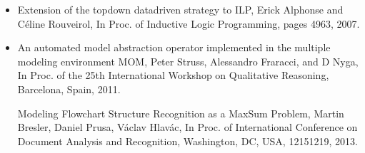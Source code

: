 \documentclass[letterpaper,10pt,openany,oneside,english]{sphinxmanual}
\begin{document}
\begin{itemize}
\sphinxAtStartPar
Exploiting structural relationships in audio music signals using markov logic networks,
Hélène Papadopoulos and George Tzanetakis,
In Proc. of 38th International Conference on Acoustics, Speech, and Signal Processing (ICASSP), pages 4493\sphinxhyphen{}4497, Canada, 2013.

\sphinxAtStartPar
Modeling chord and key structure with markov logic,
Hélène Papadopoulos and George Tzanetakis,
In Proc. of the Society for Music Information Retrieval (ISMIR), pages 121\sphinxhyphen{}126, 2012.

\item {} 
\sphinxAtStartPar
{}

\sphinxAtStartPar
Extension of the top\sphinxhyphen{}down data\sphinxhyphen{}driven strategy to ILP,
Erick Alphonse and Céline Rouveirol,
In Proc. of Inductive Logic Programming, pages 49\sphinxhyphen{}63, 2007.

\item {} 
\sphinxAtStartPar
{}

\sphinxAtStartPar
An automated model abstraction operator implemented in the multiple modeling environment MOM,
Peter Struss, Alessandro Fraracci, and D Nyga,
In Proc. of the 25th International Workshop on Qualitative Reasoning, Barcelona, Spain, 2011.

\sphinxAtStartPar
Modeling Flowchart Structure Recognition as a Max\sphinxhyphen{}Sum Problem,
Martin Bresler, Daniel Prusa, Václav Hlavác,
In Proc. of International Conference on Document Analysis and Recognition, Washington, DC, USA, 1215\sphinxhyphen{}1219, 2013.

\end{itemize}
\end{document}
